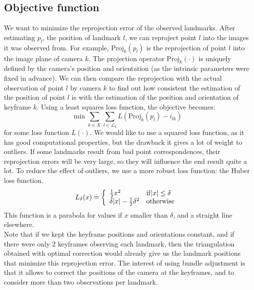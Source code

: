 \subsection{Objective function}
We want to minimize the reprojection error of the observed landmarks. After estimating $p_l$, the position of landmark $l$, we can reproject point $l$ into the images it was observed from. For example, $\mathrm{Proj}_k(p_l)$ is the reprojection of point $l$ into the image plane of camera $k$. The projection operator $\mathrm{Proj}_k(\cdot)$ is uniquely defined by the camera's position and orientation (as the intrinsic parameters were fixed in advance). We can then compare the reprojection with the actual observation of point $l$ by camera $k$ to find out how consistent the estimation of the position of point $l$ is with the estimation of the position and orientation of keyframe $k$. Using a least squares loss function, the objective becomes:
\begin{equation}
  \min \sum_{k\in\mathcal{K}}\sum_{l\in\mathcal{L}_k} L(\mathrm{Proj}_k(p_l) - i_{lk})
\end{equation}
for some loss function $L(\cdot)$. We would like to use a squared loss function, as it has good computational properties, but the drawback it gives a lot of weight to outliers. If some landmarks result from bad point correspondences, their reprojection errors will be very large, so they will influence the end result quite a lot. To reduce the effect of outliers, we use a more robust loss function: the Huber loss function.
\begin{equation} \label{eq:huber}
  L_\delta(x) = \left\{ \begin{array}{l l}
    \frac{1}{2} x^2 & \mathrm{if } |x| \leq \delta \\
    \delta|x| - \frac{1}{2}\delta^2 & \mathrm{otherwise} \end{array} \right.
\end{equation}
This function is a parabola for values if $x$ smaller than $\delta$, and a straight line elsewhere.\\

Note that if we kept the keyframe positions and orientations constant, and if there were only 2 keyframes observing each landmark, then the triangulation obtained with optimal correction would already give us the landmark positions that minimize this reprojection error. The interest of using bundle adjustment is that it allows to correct the positions of the camera at the keyframes, and to consider more than two observations per landmark.

